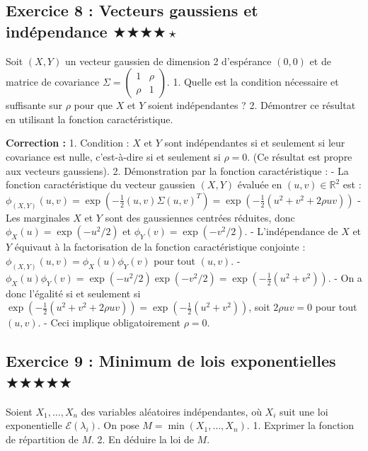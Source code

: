 \documentclass[11pt,a4paper]{article}
\begin{document}
\subsection*{Exercice 8 : Vecteurs gaussiens et indépendance \quad $\bigstar\bigstar\bigstar\bigstar\star$}

Soit $(X, Y)$ un vecteur gaussien de dimension 2 d'espérance $(0, 0)$ et de matrice de covariance $\Sigma = \begin{pmatrix} 1 & \rho \\ \rho & 1 \end{pmatrix}$.
1. Quelle est la condition nécessaire et suffisante sur $\rho$ pour que $X$ et $Y$ soient indépendantes ?
2. Démontrer ce résultat en utilisant la fonction caractéristique.

\textbf{Correction :}
1. Condition : $X$ et $Y$ sont indépendantes si et seulement si leur covariance est nulle, c'est-à-dire si et seulement si $\rho = 0$. (Ce résultat est propre aux vecteurs gaussiens).
2. Démonstration par la fonction caractéristique :
   - La fonction caractéristique du vecteur gaussien $(X, Y)$ évaluée en $(u, v) \in \mathbb{R}^2$ est :
     $\phi_{(X, Y)}(u, v) = \exp\left(-\frac{1}{2} (u, v) \Sigma (u, v)^T\right) = \exp\left(-\frac{1}{2} (u^2 + v^2 + 2\rho uv)\right)$
   - Les marginales $X$ et $Y$ sont des gaussiennes centrées réduites, donc $\phi_X(u) = \exp(-u^2/2)$ et $\phi_Y(v) = \exp(-v^2/2)$.
   - L'indépendance de $X$ et $Y$ équivaut à la factorisation de la fonction caractéristique conjointe : $\phi_{(X, Y)}(u, v) = \phi_X(u)\phi_Y(v)$ pour tout $(u, v)$.
   - $\phi_X(u)\phi_Y(v) = \exp(-u^2/2)\exp(-v^2/2) = \exp\left(-\frac{1}{2} (u^2 + v^2)\right)$.
   - On a donc l'égalité si et seulement si $\exp\left(-\frac{1}{2} (u^2 + v^2 + 2\rho uv)\right) = \exp\left(-\frac{1}{2} (u^2 + v^2)\right)$, soit $2\rho uv = 0$ pour tout $(u, v)$.
   - Ceci implique obligatoirement $\rho = 0$.

\subsection*{Exercice 9 : Minimum de lois exponentielles \quad $\bigstar\bigstar\bigstar\bigstar\bigstar$}

Soient $X_1, \ldots, X_n$ des variables aléatoires indépendantes, où $X_i$ suit une loi exponentielle $\mathcal{E}(\lambda_i)$.
On pose $M = \min(X_1, \ldots, X_n)$.
1. Exprimer la fonction de répartition de $M$.
2. En déduire la loi de $M$.
\end{document}
